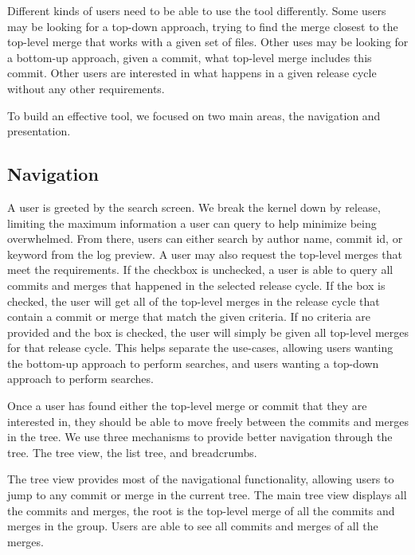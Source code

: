 \documentclass[conference, draftclsnofoot]{IEEEtran}
\begin{document}
Different kinds of users need to be able to use the tool differently.
Some users may be looking for a top-down approach, trying to find the merge
closest to the top-level merge that works with a given set of files. Other uses
may be looking for a bottom-up approach, given a commit, what top-level merge
includes this commit. Other users are interested in what happens in a given
release cycle without any other requirements.

To build an effective tool, we focused on two main areas, the navigation
and presentation.


\subsection{Navigation}

A user is greeted by the search screen. We break the kernel down by release,
limiting the maximum information a user can query to help minimize being
overwhelmed. From there, users can either search by author name, commit id, or
keyword from the log preview. A user may also request the top-level merges that
meet the requirements. If the checkbox is unchecked, a user is able to query
all commits and merges that happened in the selected release cycle. If the box
is checked, the user will get all of the top-level merges in the release cycle
that contain a commit or merge that match the given criteria. If no criteria
are provided and the box is checked, the user will simply be given all
top-level merges for that release cycle. This helps separate the use-cases,
allowing users wanting the bottom-up approach to perform searches, and users
wanting a top-down approach to perform searches.

Once a user has found either the top-level merge or commit that they are
interested in, they should be able to move freely between the commits and
merges in the tree. We use three mechanisms to provide better navigation
through the tree. The tree view, the list tree, and breadcrumbs.

The tree view provides most of the
navigational functionality, allowing users to jump to any commit or merge in
the current tree. The main tree view displays all the commits and merges, the
root is the top-level merge of all the commits and merges in the group. Users
are able to see all commits and merges of all the merges.

\end{document}
